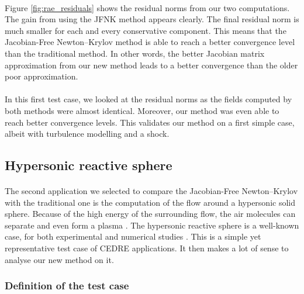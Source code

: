         \paragraph{}
        Figure \ref{fig:rae_residuals} shows the residual norms from our two computations.
        The gain from using the JFNK method appears clearly.
        The final residual norm is much smaller for each and every conservative component.
        This means that the Jacobian-Free Newton--Krylov method is able to reach a better convergence level than the traditional method.
        In other words, the better Jacobian matrix approximation from our new method leads to a better convergence than the older poor approximation.

        \paragraph{}
        In this first test case, we looked at the residual norms as the fields computed by both methods were almost identical.
        Moreover, our method was even able to reach better convergence levels.
        This validates our method on a first simple case, albeit with turbulence modelling and a shock.


    \subsection{Hypersonic reactive sphere}

      \paragraph{}
      The second application we selected to compare the Jacobian-Free Newton--Krylov with the traditional one is the computation of the flow around a hypersonic solid sphere.
      Because of the high energy of the surrounding flow, the air molecules can separate and even form a plasma .
      The hypersonic reactive sphere is a well-known case, for both experimental \cite{Lobb1964} and numerical studies \cite{DobrovGimadievKarpenkoEtAl2022}.
      This is a simple yet representative test case of CEDRE applications.
      It then makes a lot of sense to analyse our new method on it.

      \subsubsection{Definition of the test case}

